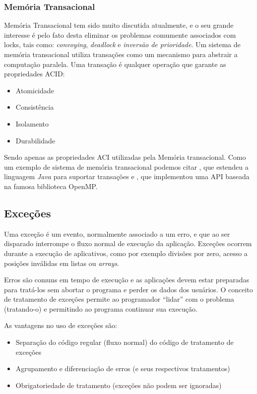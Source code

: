 \subsubsection{Memória Transacional}


Memória Transacional tem sido muito discutida atualmente, e o seu grande
interesse é pelo fato desta eliminar os problemas comumente associados com
locks, tais como: \cite{xxx} {\it convoying}, \cite{xxx} {\it deadlock} e
\cite{xxx} {\it inversão de
prioridade}. Um sistema de memória transacional utiliza \cite{xxx} transações como
um mecanismo para abstrair a computação paralela. Uma transação é qualquer
operação que garante as propriedades ACID:

\begin{itemize}
    \item Atomicidade
    \item Consistência
    \item Isolamento
    \item Durabilidade
\end{itemize}

Sendo apenas as propriedades ACI utilizadas pela Memória transacional. Como
um exemplo de sistema de memória transacional podemos citar  \cite{xxx},
que estendeu a linguagem \textit{Java} para suportar transações e
\cite{xxx}, que implementou uma API baseada na famosa biblioteca OpenMP.

\subsection{Exceções}

Uma exceção é um evento, normalmente associado a um erro, e que ao ser disparado interrompe o 
fluxo normal de execução da aplicação. Exceções ocorrem durante a execução de aplicativos, como 
por exemplo divisões por zero, acesso a posições inválidas em listas ou
\textit{arrays}.

Erros são comuns em tempo de execução e as aplicações devem estar
preparadas para tratá-los sem abortar o programa e perder os dados dos
usuários. O conceito de tratamento de exceções permite ao programador
``lidar'' com o problema (tratando-o) e permitindo ao programa continuar
sua execução.

As vantagens no uso de exceções são: 

\begin{itemize}
\item Separação do código regular (fluxo normal) do código de tratamento de exceções
\item Agrupamento e diferenciação de erros (e seus respectivos tratamentos)
\item Obrigatoriedade de tratamento (exceções não podem ser ignoradas)
\end{itemize}

